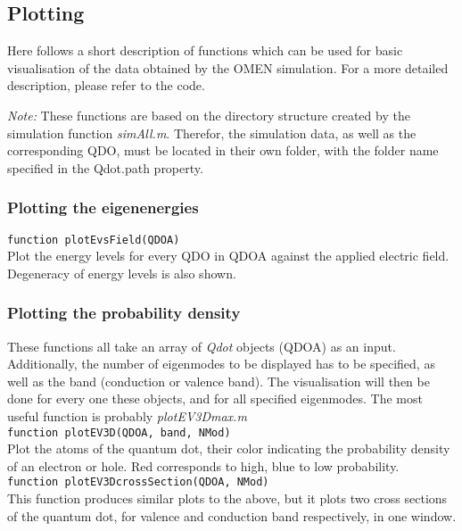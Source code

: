\subsection{Plotting}
Here follows a short description of functions which can be used for basic visualisation of the data obtained by the OMEN simulation. For a more detailed description, please refer to the code.

\textit{Note:} These functions are based on the directory structure created by the simulation function \textit{simAll.m}. Therefor, the simulation data, as well as the corresponding QDO, must be located in their own folder, with the folder name specified in the Qdot.path property.

\subsubsection{Plotting the eigenenergies}
\lstinline{function plotEvsField(QDOA)}\\

Plot the energy levels for every QDO in QDOA against the applied electric field. Degeneracy of energy levels is also shown.

\subsubsection{Plotting the probability density}
These functions all take an array of \textit{Qdot} objects (QDOA) as an input. Additionally, the number of eigenmodes to be displayed has to be specified, as well as the band (conduction or valence band). The visualisation will then be done for every one these objects, and for all specified eigenmodes. The most useful function is probably \textit{plotEV3Dmax.m}\\

\lstinline{function plotEV3D(QDOA, band, NMod) }\\

Plot the atoms of the quantum dot, their color indicating the probability density of an electron or hole. Red corresponds to high, blue to low probability.\\

\lstinline{function plotEV3DcrossSection(QDOA, NMod) }\\

This function produces similar plots to the above, but it plots two cross sections of the quantum dot, for valence and conduction band respectively, 
in one window.\\

